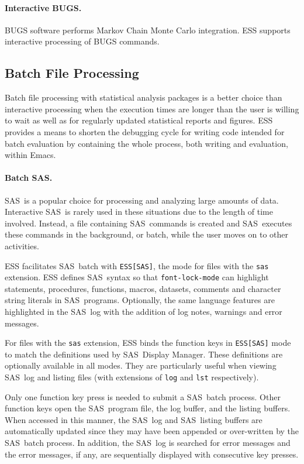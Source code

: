 \documentclass{article}
\newcommand*{\SAS}{\textsc{SAS}}
\newcommand{\stexttt}[1]{{\small\texttt{#1}}}
\begin{document}
\paragraph{Interactive BUGS.}
BUGS software performs Markov Chain Monte Carlo integration.  ESS
supports interactive processing of BUGS commands.

\subsection{Batch File Processing}
\label{sec:batch-file}

Batch file processing with statistical analysis packages is a better
choice than interactive processing when the execution times are longer
than the user is willing to wait as well as for regularly updated
statistical reports and figures.  ESS provides a means to shorten the
debugging cycle for writing code intended for batch evaluation by
containing the whole process, both writing and evaluation, within
Emacs.

\paragraph{Batch \SAS.}
\label{sec:sas-batch}

\SAS\ is a popular choice for processing and analyzing large amounts
of data.  Interactive \SAS\ is rarely used in these
situations due to the length of time involved.  Instead, a file
containing \SAS\ commands is created and \SAS\ executes these commands
in the background, or batch, while the user moves on to other
activities.

ESS facilitates \SAS\ batch with \stexttt{ESS[SAS]}, the mode for
files with the \stexttt{sas} extension.  ESS defines \SAS\ syntax so
that \stexttt{font-lock-mode} can highlight statements, procedures,
functions, macros, datasets, comments and character string literals in
\SAS\ programs.  Optionally, the same language features are
highlighted in the \SAS\ log with the addition of log notes, warnings
and error messages.

For files with the \stexttt{sas} extension, ESS binds the function
keys in \stexttt{ESS[SAS]} mode to match the definitions used by \SAS\
Display Manager.  These definitions are optionally available in all
modes.  They are particularly useful when viewing \SAS\ log and
listing files (with extensions of \stexttt{log} and \stexttt{lst}
respectively).

Only one function key press is needed to submit a \SAS\ batch process.
Other function keys open the \SAS\ program file, the log buffer, and
the listing buffers.  When accessed in this manner, the \SAS\ log and
\SAS\ listing buffers are automatically updated since they may have
been appended or over-written by the \SAS\ batch process.  In
addition, the \SAS\ log is searched for error messages and the error
messages, if any, are sequentially displayed with consecutive key
presses.
\end{document}
